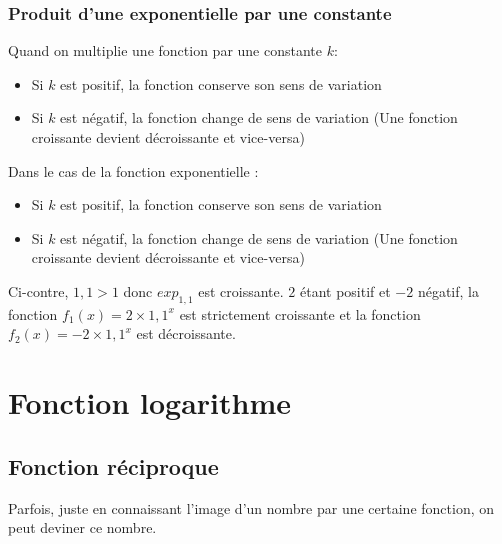 \documentclass[10pt,a4paper]{book}
\begin{document}
\subsubsection{Produit d'une exponentielle par une constante}

Quand on multiplie une fonction par une constante $k$:
\begin{itemize}
    \item Si $k$ est positif, la fonction conserve son sens de variation
    \item Si $k$ est négatif, la fonction change de sens de variation (Une fonction croissante devient décroissante et vice-versa)    
\end{itemize}

\begin{minipage}{0.5\textwidth}
    Dans le cas de la fonction exponentielle :
    \begin{itemize}
        \item Si $k$ est positif, la fonction conserve son sens de variation
        \item Si $k$ est négatif, la fonction change de sens de variation (Une fonction croissante devient décroissante et vice-versa)    
    \end{itemize}

    Ci-contre, $1{,}1 > 1$ donc $exp_{1{,}1}$ est croissante.  $2$ étant positif et $-2$ négatif, la fonction $f_1(x)= 2 \times {1,1}^x$ est strictement croissante
    et la fonction $f_2(x)= -2 \times {1,1}^x$ est décroissante.
\end{minipage}
\begin{minipage}{0.4\textwidth}
\end{minipage}



\section{Fonction logarithme}

\subsection{Fonction réciproque}

Parfois, juste en connaissant l'image d'un nombre par une certaine fonction, on peut deviner ce nombre. 
\end{document}
